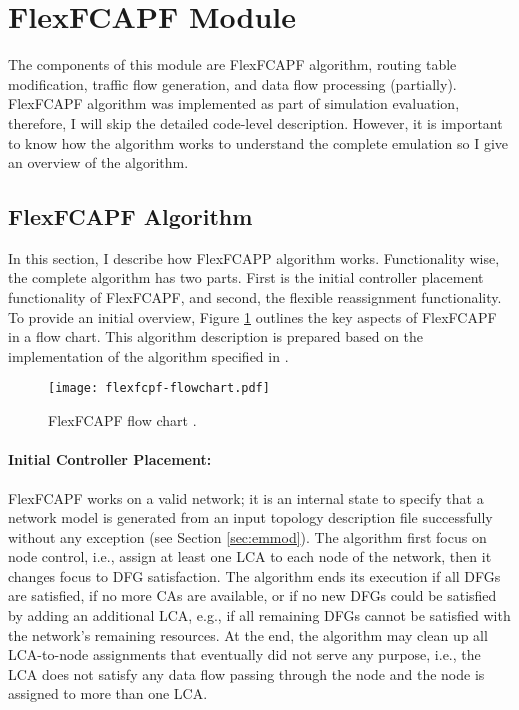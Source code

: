 \section{FlexFCAPF Module}
The components of this module are FlexFCAPF algorithm, routing table modification, traffic flow generation, and data flow processing (partially). FlexFCAPF algorithm was implemented as part of simulation evaluation, therefore, I will skip the detailed code-level description. However, it is important to know how the algorithm works to understand the complete emulation so I give an overview of the algorithm.

\subsection{FlexFCAPF Algorithm} \label{sec:algoadap}
In this section, I describe how FlexFCAPP algorithm works. Functionality wise, the complete algorithm has two parts. First is the initial controller placement functionality of FlexFCAPF, and second, the flexible reassignment functionality. To provide an initial overview, Figure \ref{fig:flexfcpfflow} outlines the key aspects of FlexFCAPF in a flow chart. This algorithm description is prepared based on the implementation of the algorithm specified in \cite{7343600}.

\begin{figure}[H]
\begin{center}
	\resizebox{\textwidth}{!}
	{\texttt{[image: flexfcpf-flowchart.pdf]}}
	\caption{FlexFCAPF flow chart \cite{7343600}.}
	\label{fig:flexfcpfflow}
\end{center}
\end{figure}

\paragraph{Initial Controller Placement:}
FlexFCAPF works on a valid network; it is an internal state to specify that a network model is generated from an input topology description file successfully without any exception (see Section \ref{sec:emmod}). The algorithm first focus on node control, i.e., assign at least one LCA to each node of the network, then it changes focus to DFG satisfaction. The algorithm ends its execution if all DFGs are satisfied, if no more CAs are available, or if no new DFGs could be satisfied by adding an additional LCA, e.g., if all remaining DFGs cannot be satisfied with the network's remaining resources. At the end, the algorithm may clean up all LCA-to-node assignments that eventually did not serve any purpose, i.e., the LCA does not satisfy any data flow passing through the node and the node is assigned to more than one LCA.

